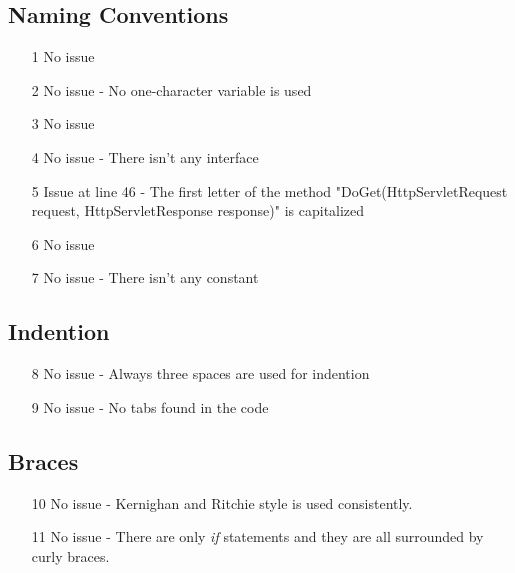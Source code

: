 

\subsection{Naming Conventions}
\begin{itemize}
\item[1] No issue
\item[2] No issue - No one-character variable is used
\item[3] No issue
\item[4] No issue - There isn't any interface
\item[5] Issue at line 46 - The first letter of the method "DoGet(HttpServletRequest request, HttpServletResponse response)" is capitalized
\item[6] No issue
\item[7] No issue - There isn't any constant
\end{itemize}
\subsection{Indention}
\begin{itemize}
\item[8] No issue - Always three spaces are used for indention
\item[9] No issue - No tabs found in the code
\end{itemize}
\subsection{Braces}
\begin{itemize}
\item[10] No issue - Kernighan and Ritchie style is used consistently.
\item[11] No issue - There are only \textit{if} statements and they are all surrounded by curly braces.
\end{itemize}

